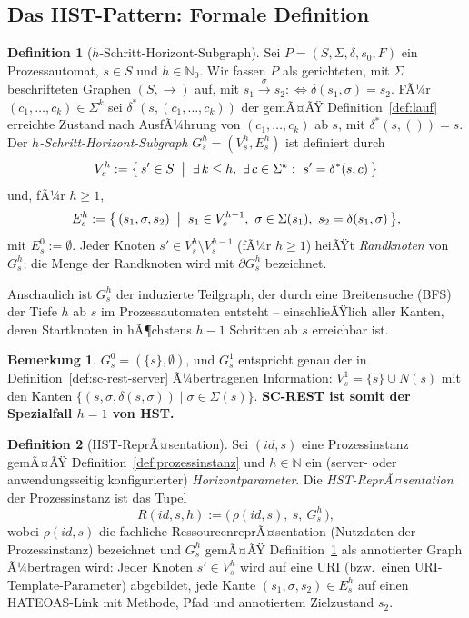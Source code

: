 ﻿\documentclass[a4paper,12pt]{article}
\theoremstyle{definition}
\newtheorem{definition}{Definition}
\newtheorem{bemerkung}{Bemerkung}
\begin{document}
\subsection{Das HST-Pattern: Formale Definition}
\label{sec:hst-definition}

\begin{definition}[$h$-Schritt-Horizont-Subgraph]
	\label{def:horizont-subgraph}
	Sei $P=(S,\Sigma,\delta,s_0,F)$ ein Prozessautomat, $s\in S$ und $h\in\mathbb{N}_0$.
	Wir fassen $P$ als gerichteten, mit $\Sigma$ beschrifteten Graphen $(S,\to)$ auf, mit
	$s_1\xrightarrow{\sigma}s_2 :\Leftrightarrow \delta(s_1,\sigma)=s_2$. FÃ¼r
	$(c_1,\ldots,c_k)\in\Sigma^k$ sei $\delta^{*}(s,(c_1,\ldots,c_k))$ der gemÃ¤ÃŸ
	Definition~\ref{def:lauf} erreichte Zustand nach AusfÃ¼hrung von
	$(c_1,\ldots,c_k)$ ab $s$, mit $\delta^{*}(s,())=s$. Der \emph{$h$-Schritt-Horizont-Subgraph}
	$G_s^h=(V_s^h,E_s^h)$ ist definiert durch
	\[
		V_s^h := \bigl\{\, s' \in S \;\bigm|\; \exists\, k\le h,\ \exists\, c\in\Sigma^k:\
		s'=\delta^{*}(s,c) \,\bigr\}
	\]
	und, fÃ¼r $h\ge1$,
	\[
		E_s^h := \bigl\{\, (s_1,\sigma,s_2) \;\bigm|\; s_1\in V_s^{h-1},\ \sigma\in\Sigma(s_1),\
		s_2=\delta(s_1,\sigma) \,\bigr\},
	\]
	mit $E_s^0:=\emptyset$. Jeder Knoten $s'\in V_s^h\setminus V_s^{h-1}$ (fÃ¼r $h\ge1$)
	heiÃŸt \emph{Randknoten} von $G_s^h$; die Menge der Randknoten wird mit $\partial
	G_s^h$ bezeichnet.
\end{definition}

Anschaulich ist $G_s^h$ der induzierte Teilgraph, der durch eine Breitensuche (BFS) der
Tiefe $h$ ab $s$ im Prozessautomaten entsteht -- einschlieÃŸlich aller Kanten, deren
Startknoten in hÃ¶chstens $h-1$ Schritten ab $s$ erreichbar ist.

\begin{bemerkung}
	\label{bem:sc-rest-spezialfall}
	$G_s^0=(\{s\},\emptyset)$, und $G_s^1$ entspricht genau der in
	Definition~\ref{def:sc-rest-server} Ã¼bertragenen Information: $V_s^1=\{s\}\cup N(s)$
	mit den Kanten $\{(s,\sigma,\delta(s,\sigma))\mid \sigma\in\Sigma(s)\}$. \textbf{SC-REST
	ist somit der Spezialfall $h=1$ von HST.}
\end{bemerkung}

\begin{definition}[HST-ReprÃ¤sentation]
	\label{def:hst-repraesentation}
	Sei $(id,s)$ eine Prozessinstanz gemÃ¤ÃŸ Definition~\ref{def:prozessinstanz} und
	$h\in\mathbb{N}$ ein (server- oder anwendungsseitig konfigurierter)
	\emph{Horizontparameter}. Die \emph{HST-ReprÃ¤sentation} der Prozessinstanz ist das
	Tupel
	\[
		R(id,s,h) := \bigl(\, \rho(id,s),\ s,\ G_s^h \,\bigr),
	\]
	wobei $\rho(id,s)$ die fachliche RessourcenreprÃ¤sentation (Nutzdaten der
	Prozessinstanz) bezeichnet und $G_s^h$ gemÃ¤ÃŸ Definition~\ref{def:horizont-subgraph}
	als annotierter Graph Ã¼bertragen wird: Jeder Knoten $s'\in V_s^h$ wird auf eine URI
	(bzw.\ einen URI-Template-Parameter) abgebildet, jede Kante $(s_1,\sigma,s_2)\in
	E_s^h$ auf einen HATEOAS-Link mit Methode, Pfad und annotiertem Zielzustand $s_2$.
\end{definition}
\end{document}
